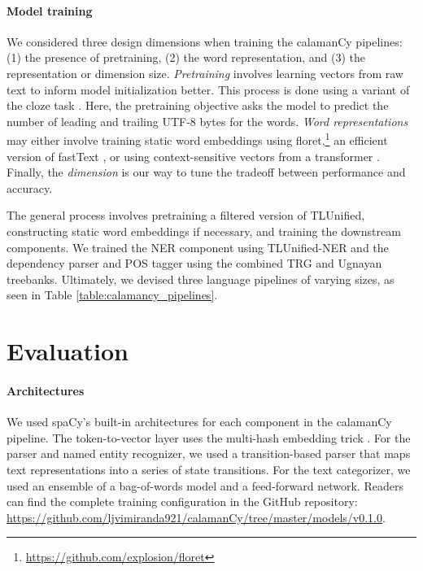 \documentclass[11pt]{article}
\begin{document}


\paragraph*{Model training}

We considered three design dimensions when training the calamanCy pipelines: (1) the presence of pretraining, (2) the word representation, and (3) the representation or dimension size.
\textit{Pretraining} involves learning vectors from raw text to inform model initialization better.
This process is done using a variant of the cloze task \citep{Devlin2019BERTPO}.
Here, the pretraining objective asks the model to predict the number of leading and trailing UTF-8 bytes for the words.
\textit{Word representations} may either involve training static word embeddings using floret,\footnote[3]{\url{https://github.com/explosion/floret}} an efficient version of fastText \citep{Bojanowski2016EnrichingWV}, or using context-sensitive vectors from a transformer \citep{Vaswani2017AttentionIA}.
Finally, the \textit{dimension} is our way to tune the tradeoff between performance and accuracy.

The general process involves pretraining a filtered version of TLUnified, constructing static word embeddings if necessary, and training the downstream components.
We trained the NER component using TLUnified-NER and the dependency parser and POS tagger using the combined TRG and Ugnayan treebanks.
Ultimately, we devised three language pipelines of varying sizes, as seen in Table \ref{table:calamancy_pipelines}.

\section{Evaluation}



\paragraph*{Architectures}

We used spaCy's built-in architectures for each component in the calamanCy pipeline.
The token-to-vector layer uses the multi-hash embedding trick \citep{Miranda2022MultiHE}.
For the parser and named entity recognizer, we used a transition-based parser that maps text representations into a series of state transitions.
For the text categorizer, we used an ensemble of a bag-of-words model and a feed-forward network.
Readers can find the complete training configuration in the GitHub repository: \url{https://github.com/ljvimiranda921/calamanCy/tree/master/models/v0.1.0}.
\end{document}
